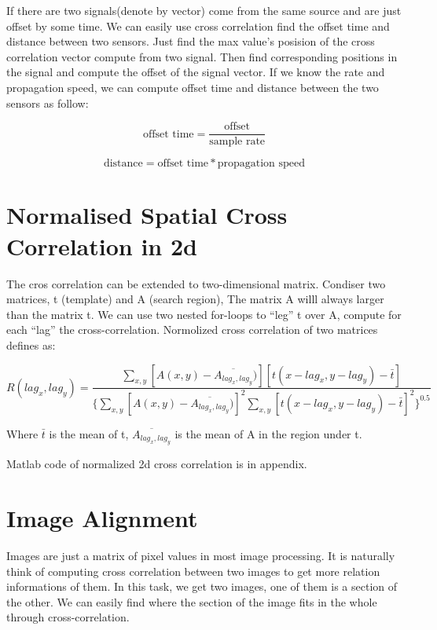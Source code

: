 If there are two signals(denote by vector) come from the same source and are just offset by some time. We can easily use cross correlation find the offset time and distance between two sensors. Just find the max value's posision of the cross correlation vector compute from two signal. Then find corresponding positions in the signal and compute the offset of the signal vector. If we know the rate and propagation speed, we can compute offset time and distance between the two sensors as follow:

\begin{equation*}
\text{offset time}=\frac{\text{offset}}{\text{sample rate}} 
\end{equation*}

\begin{equation*}
\text{distance}=\text{offset time} * \text{propagation speed}
\end{equation*}

\section{Normalised Spatial Cross Correlation in 2d}

The cros correlation can be extended to two-dimensional matrix. Condiser two matrices, t (template) and A (search region), The matrix A willl always larger than the matrix t. We can use two nested for-loops to ``leg'' t over A, compute for each ``lag'' the cross-correlation. Normolized cross correlation of two matrices defines as:

\begin{equation*}
R(lag_{x},lag_{y})=
\frac{\sum_{x,y}[A(x,y)-\overline{A_{lag_{x},lag_{y}}})][t(x-lag_{x},y-lag_{y})-\bar{t}]}
{\{\sum_{x,y}[A(x,y)-\overline{A_{lag_{x},lag_{y}}})]^2
	\sum_{x,y}[t(x-lag_{x},y-lag_{y})-\bar{t}]^2
	\}^{0.5}}
\end{equation*}

Where $\bar{t}$ is the mean of t, $\overline{A_{lag_{x},lag_{y}}}$ is the mean of A in the region under t. 

Matlab code of normalized 2d cross correlation is in appendix.

\section{Image Alignment}

Images are just a matrix of pixel values in most image processing. It is naturally think of computing cross correlation between two images to get more relation informations of them. In this task, we get two images, one of them is a section of the other. We can easily find where the section of the image fits in the whole through cross-correlation.

